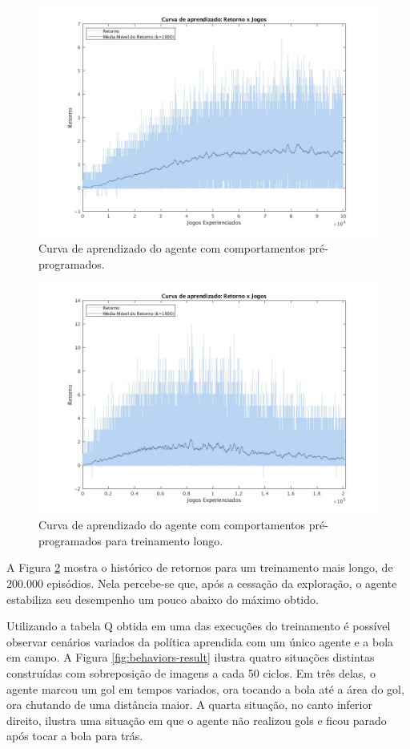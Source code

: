 \begin{figure}[H]
	\includegraphics[width=0.9\linewidth]{figs/curva-behaviors-tabular.jpg}
	\centering
	\caption{Curva de aprendizado do agente com comportamentos pré-programados.}
	\label{fig:single-agent-tabular-behaviors}
\end{figure}

\begin{figure}[H]
	\includegraphics[width=0.9\linewidth]{figs/curvalonga-behaviors-tabular.jpg}
	\centering
	\caption{Curva de aprendizado do agente com comportamentos pré-programados para treinamento longo.}
	\label{fig:curvalonga-bhv}
\end{figure}

A Figura \ref{fig:curvalonga-bhv} mostra o histórico de retornos para um treinamento mais longo, de 200.000 episódios. Nela percebe-se que, após a cessação da exploração, o agente estabiliza seu desempenho um pouco abaixo do máximo obtido.

Utilizando a tabela Q obtida em uma das execuções do treinamento é possível observar cenários variados da política aprendida com um único agente e a bola em campo. A Figura \ref{fig:behaviors-result} ilustra quatro situações distintas construídas com sobreposição de imagens a cada 50 ciclos. Em três delas, o agente marcou um gol em tempos variados, ora tocando a bola até a área do gol, ora chutando de uma distância maior. A quarta situação, no canto inferior direito, ilustra uma situação em que o agente não realizou gols e ficou parado após tocar a bola para trás.

